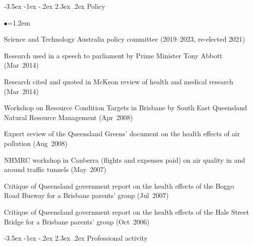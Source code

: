 \documentclass[a4paper,11pt]{article}
\makeatletter
\renewcommand\section{\@startsection {section}{1}{\z@}%
                                   {-3.5ex \@plus -1ex \@minus -.2ex}%
                                   {2.3ex \@plus.2ex}%
                                   {\normalfont\large\bfseries\color{blue}}}
\renewcommand{\labelitemi}{$\bullet$}
\makeatother
\begin{document}
\begin{raggedright}
\section{Policy}

\begin{list}{\labelitemi}{\leftmargin=1.2em}\addtolength{\itemsep}{-0.4\baselineskip}
\item Science and Technology Australia policy committee (2019--2023, re-elected 2021)
\item Research used in a speech to parliament by Prime Minister Tony Abbott (Mar~2014)
\item Research cited and quoted in McKeon review of health and medical research (Mar~2014)
\item Workshop on Resource Condition Targets in Brisbane by South East Queensland Natural Resource Management (Apr~2008)
\item Expert review of the Queensland Greens' document on the health effects of air pollution (Aug~2008)
\item NHMRC workshop in Canberra (flights and expenses paid) on air quality in and around traffic tunnels (May~2007)
\item Critique of Queensland government report on the health effects of the Boggo Road Busway for a Brisbane parents' group (Jul~2007)
\item Critique of Queensland government report on the health effects of the Hale Street Bridge for a Brisbane parents' group (Oct~2006)
\end{list}

\section{Professional activity}


\end{raggedright}
\end{document}

